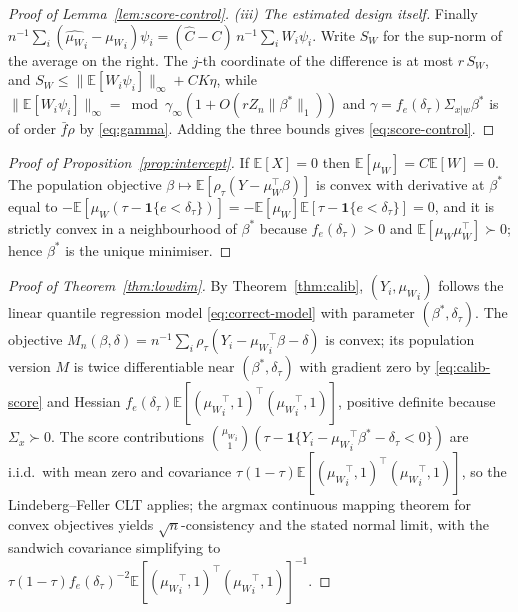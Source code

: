 \documentclass[12pt,a4paper]{article}
\theoremstyle{definition}
\theoremstyle{remark}
\newcommand{\E}{\mathbb{E}}
\newcommand{\ind}[1]{\mathbf{1}\{#1\}}
\newcommand{\betas}{\beta^*}
\newcommand{\muv}{\mu_W}
\newcommand{\Sxw}{\Sigma_{x|w}}
\newcommand{\Ccal}{C}
\begin{document}
\begin{proof}[Proof of Lemma~\ref{lem:score-control}]
\emph{(iii) The estimated design itself.} Finally
$n^{-1}\sum_i({\hat{\muv}}_i-{\muv}_i)\psi_i = (\hat\Ccal-\Ccal)\,n^{-1}\sum_iW_i\psi_i$.
Write $S_W$ for the sup-norm of the average on the right. The $j$-th coordinate of the
difference is at most $r\,S_W$, and
$S_W\le\|\E[W_i\psi_i]\|_\infty+CK\eta$, while
$\|\E[W_i\psi_i]\|_\infty=\bmod{\gamma}_\infty(1+O(rZ_n\|\betas\|_1))$ and
$\gamma=f_e(\delta_\tau)\Sxw\betas$ is of order $\bar f\rho$ by \eqref{eq:gamma}. Adding the
three bounds gives \eqref{eq:score-control}.
\end{proof}

\begin{proof}[Proof of Proposition~\ref{prop:intercept}]
If $\E[X]=0$ then $\E[\muv]=\Ccal\E[W]=0$. The population objective
$\beta\mapsto\E[\rho_\tau(Y-\muv^\top\beta)]$ is convex with derivative at $\betas$ equal
to $-\E[\muv(\tau-\ind{e<\delta_\tau})] = -\E[\muv]\E[\tau-\ind{e<\delta_\tau}]=0$, and it
is strictly convex in a neighbourhood of $\betas$ because $f_e(\delta_\tau)>0$ and
$\E[\muv\muv^\top]\succ0$; hence $\betas$ is the unique minimiser.
\end{proof}

\begin{proof}[Proof of Theorem~\ref{thm:lowdim}]
By Theorem~\ref{thm:calib}, $(Y_i,{\muv}_i)$ follows the linear quantile regression model
\eqref{eq:correct-model} with parameter $(\betas,\delta_\tau)$. The objective
$M_n(\beta,\delta) = n^{-1}\sum_i\rho_\tau(Y_i-{\muv}_i^\top\beta-\delta)$ is convex; its
population version $M$ is twice differentiable near $(\betas,\delta_\tau)$ with gradient
zero by \eqref{eq:calib-score} and Hessian
$f_e(\delta_\tau)\E[({\muv}_i^\top,1)^\top({\muv}_i^\top,1)]$, positive definite because
$\Sigma_x\succ0$. The score contributions
$\binom{{\muv}_i}{1}(\tau-\ind{Y_i-{\muv}_i^\top\betas-\delta_\tau<0})$ are i.i.d.\ with mean
zero and covariance $\tau(1-\tau)\E[({\muv}_i^\top,1)^\top({\muv}_i^\top,1)]$, so the
Lindeberg--Feller CLT applies; the argmax continuous mapping theorem for convex objectives
\citep{pollard1991} yields $\sqrt{n}$-consistency and the stated normal limit, with the
sandwich covariance simplifying to
$\tau(1-\tau)f_e(\delta_\tau)^{-2}\E[({\muv}_i^\top,1)^\top({\muv}_i^\top,1)]^{-1}$.
\end{proof}
\end{document}
